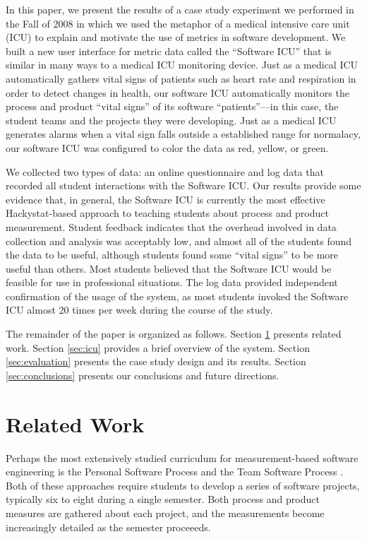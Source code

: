 \documentclass{acm_proc_article-sp}
\begin{document}
In this paper, we present the results of a case study experiment we
performed in the Fall of 2008 in which we used the metaphor of a medical
intensive care unit (ICU) to explain and motivate the use of metrics in
software development.  We built a new user interface for metric data called
the ``Software ICU'' that is similar in many ways to a medical ICU
monitoring device.  Just as a medical ICU automatically gathers vital signs
of patients such as heart rate and respiration in order to detect changes
in health, our software ICU automatically monitors the process and product
``vital signs'' of its software ``patients''---in this case, the student
teams and the projects they were developing.  Just as a medical ICU
generates alarms when a vital sign falls outside a established range for
normalacy, our software ICU was configured to color the data as red,
yellow, or green.

We collected two types of data: an online questionnaire and log data that
recorded all student interactions with the Software ICU.  Our results
provide some evidence that, in general, the Software ICU is currently the
most effective Hackystat-based approach to teaching students about process
and product measurement.  Student feedback indicates that the overhead
involved in data collection and analysis was acceptably low, and almost all
of the students found the data to be useful, although students found some
``vital signs'' to be more useful than others. Most students believed that
the Software ICU would be feasible for use in professional situations.  The
log data provided independent confirmation of the usage of the system, as
most students invoked the Software ICU almost 20 times per week during the
course of the study.

The remainder of the paper is organized as follows.  Section
\ref{sec:related} presents related work.  Section \ref{sec:icu} provides a
brief overview of the system. Section \ref{sec:evaluation} presents the
case study design and its results.  Section \ref{sec:conclusions} presents
our conclusions and future directions.

\section {Related Work}
\label{sec:related}

Perhaps the most extensively studied curriculum for measurement-based
software engineering is the Personal Software Process \cite{Humphrey95} and
the Team Software Process \cite{Humphrey00}.  Both of these approaches
require students to develop a series of software projects, typically six to
eight during a single semester.  Both process and product measures are
gathered about each project, and the measurements become increasingly
detailed as the semester proceeeds.
\end{document}
